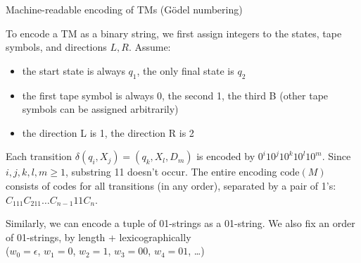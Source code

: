 \documentclass[handout]{beamer}
\begin{document}
\begin{frame}{Machine-readable encoding of TMs (Gödel numbering)}

    \vspace{-5pt}
    To encode a TM as a binary string, we first assign integers to the states, tape symbols, and directions $L,R$. Assume:
    \begin{itemize}
        \item the start state is always $q_1$, the only final state is $q_2$
        \item the first tape symbol is always 0, the second 1, the third B (other tape symbols can be assigned arbitrarily)
        \item the direction L is 1, the direction R is 2
    \end{itemize}
    Each transition $\delta(q_i,X_j)=(q_k,X_l,D_m)$ is encoded by $0^i10^j10^k10^l10^m$. Since $i,j,k,l,m\geq 1$, substring 11 doesn't occur.
    The entire encoding \alert{$\mathrm{code}(M)$} consists of codes for all transitions (in any order), separated by a pair of 1's: $C_111C_211\ldots C_{n-1}11C_n$.

    Similarly, we can encode a tuple of 01-strings as a 01-string. We also fix an order of 01-strings, by length + lexicographically \\ ($w_0=\epsilon$, $w_1=0$, $w_2=1$, $w_3=00$, $w_4=01$, \dots)

\end{frame}
\end{document}
